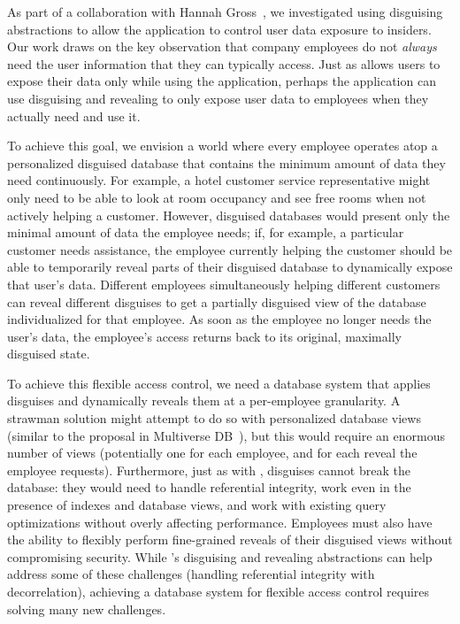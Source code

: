 %
As part of a collaboration with Hannah Gross~\cite{funhouse}, we investigated
using disguising abstractions to allow the application to control user data
exposure to insiders.
%
Our work draws on the key observation that company employees do not \emph{always}
need the user information that they can typically access.
%
Just as \sys allows users to expose their data only while using the application,
perhaps the application can use disguising and revealing to only expose user
data to employees when they actually need and use it.
%

%
To achieve this goal, we envision a world where every employee operates atop a
personalized disguised database that contains the minimum amount of data they
need continuously. For example, a hotel customer service representative might
only need to be able to look at room occupancy and see free rooms when not
actively helping a customer.
%
%
However, disguised databases would present only the minimal amount of data the
employee needs; if, for example, a particular customer needs assistance, the
employee currently helping the customer should be able to temporarily reveal
parts of their disguised database to dynamically expose that user's data.
%
Different employees simultaneously helping different customers can reveal
different disguises to get a partially disguised view of the database
individualized for that employee.
%
As soon as the employee no longer needs the user's data, the employee’s access
returns back to its original, maximally disguised state.
%

%
To achieve this flexible access control, we need a database system that applies
disguises and dynamically reveals them at a per-employee granularity.
%
A strawman solution might attempt to do so with personalized database views
(similar to the proposal in Multiverse DB~\cite{multiverse}), but this would
require an enormous number of views (potentially one for each employee, and for
each reveal the employee requests).
%
Furthermore, just as with \sys, disguises cannot break the database: they would
need to handle referential integrity, work even in the presence of indexes and
database views, and work with existing query optimizations without overly
affecting performance.
%
Employees must also have the ability to flexibly perform fine-grained reveals of
their disguised views without compromising security.
%
While \sys's disguising and revealing abstractions can help address some of
these challenges (\eg handling referential integrity with decorrelation),
achieving a database system for flexible access control requires solving many
new challenges.

